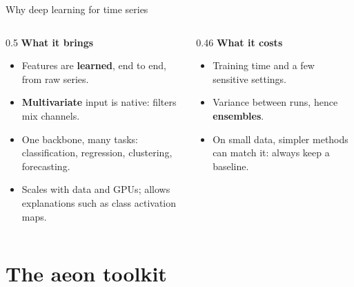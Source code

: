 \documentclass[aspectratio=169,10pt]{beamer}
\begin{document}
\begin{frame}{Why deep learning for time series}
  \begin{columns}[t]
    \begin{column}{0.5\textwidth}
      \textbf{What it brings}
      \begin{itemize}
        \item Features are \textbf{learned}, end to end, from raw series.
        \item \textbf{Multivariate} input is native: filters mix channels.
        \item One backbone, many tasks: classification, regression, clustering, forecasting.
        \item Scales with data and GPUs; allows explanations such as class activation maps.
      \end{itemize}
    \end{column}
    \begin{column}{0.46\textwidth}
      \textbf{What it costs}
      \begin{itemize}
        \item Training time and a few sensitive settings.
        \item Variance between runs, hence \textbf{ensembles}.
        \item On small data, simpler methods can match it: always keep a baseline.
      \end{itemize}
    \end{column}
  \end{columns}
  \vfill
\end{frame}

\section{The aeon toolkit}
\end{document}
